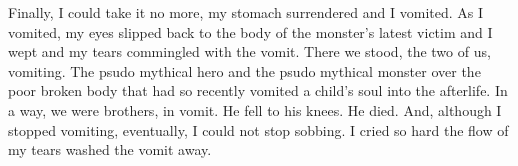 Finally, I could take it no more, my stomach surrendered and I
vomited. As I vomited, my eyes slipped back to the body of the
monster's latest victim and I wept and my tears commingled
with the vomit. There we stood, the two of us, vomiting. The psudo
mythical hero and the psudo mythical monster over the poor broken
body that had so recently vomited a child's soul into the
afterlife. In a way, we were brothers, in vomit. He fell to his
knees. He died. And, although I stopped vomiting, eventually, I
could not stop sobbing. I cried so hard the flow of my tears washed
the vomit away. 
 






